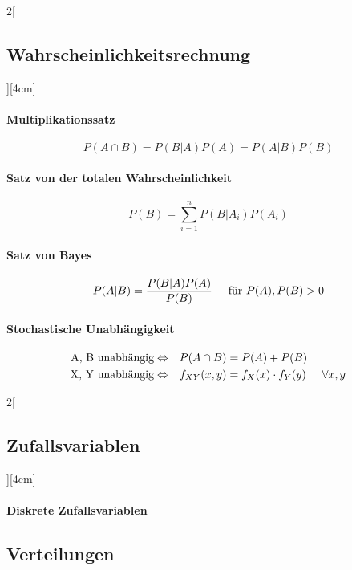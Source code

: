 \documentclass[8pt]{extarticle}
\begin{document}
\begin{multicols}{2}[\subsection{Wahrscheinlichkeitsrechnung}][4cm]
\paragraph{Multiplikationssatz}

$$P(A \cap B)=P(B|A)P(A)=P(A|B)P(B)$$

\paragraph{Satz von der totalen Wahrscheinlichkeit}

$$P(B)=\sum\limits_{i=1}^nP(B|A_i)P(A_i)$$

\paragraph{Satz von Bayes}

$$P(A|B)=\frac{P(B|A)P(A)}{P(B)} \hspace{0.5cm} \text{für } P(A), P(B) > 0$$

\paragraph{Stochastische Unabhängigkeit}

\begin{alignat*}{2}
 \text{A, B unabhängig}  \Leftrightarrow  && P(A\cap B) &= P(A)+P(B) \\
 \text{X, Y unabhängig}  \Leftrightarrow && f_{XY}(x,y) &= f_X(x)\cdot f_Y(y) \hspace{0.5cm} \forall x,y
\end{alignat*}

\end{multicols}


\begin{multicols}{2}[\subsection{Zufallsvariablen}][4cm]

  \paragraph{Diskrete Zufallsvariablen}
  


\end{multicols}

\subsection{Verteilungen}
\end{document}
